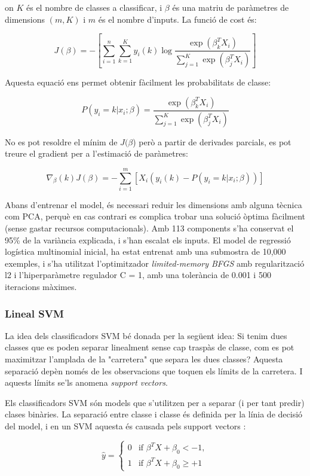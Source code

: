 \documentclass[12pt, spanish]{article}
\begin{document}
on $K$ és el nombre de classes a classificar, i $\beta$ és una matriu de paràmetres de dimensions $(m, K)$ i $m$ és el nombre d'inputs. La funció de cost és:


$$
J(\beta) = - [\sum^n_{i = 1}\sum^K_{k = 1} y_{i}(k) \log\frac{\exp(\beta_k^T X_i)}{\sum^K_{j = 1}\exp(\beta_j^T X_i)}]
$$

Aquesta equació ens permet obtenir fàcilment les probabilitats de classe:

$$
P(y_i = k | x_i ; \beta) =  \frac{\exp(\beta_k^T X_i)}{\sum^K_{j = 1}\exp(\beta_j^T X_i)}
$$

No es pot resoldre el mínim de $J(\beta$) però a partir de derivades parcials, es pot treure el gradient per a l'estimació de paràmetres:

$$
\nabla_\beta (k) J(\beta) = -\sum^m_{i = 1} [X_i (y_i(k) - P(y_i = k | x_i ; \beta))]
$$

Abans d'entrenar el model, és necessari reduir les dimensions amb alguna tècnica com PCA, perquè en cas contrari es complica trobar una solució òptima fàcilment (sense gastar recursos computacionals). Amb 113 components s'ha conservat el 95\% de la variància explicada, i s'han escalat els inputs. El model de regressió logística multinomial inicial, ha estat entrenat amb una submostra de 10,000 exemples, i s'ha utilitzat l'optimitzador \textit{limited-memory BFGS} amb regularització l2 i l'hiperparàmetre regulador C = 1, amb una tolerància de 0.001 i 500 iteracions màximes.

\subsubsection{Lineal SVM}

La idea dels classificadors SVM bé donada per la següent idea: Si tenim dues classes que es poden separar linealment sense cap traspàs de classe, com es pot maximitzar l'amplada de la "carretera" que separa les dues classes? Aquesta separació depèn només de les observacions que toquen els límits de la carretera. I aquests límits se'ls anomena \textit{support vectors}.

 Els classificadors SVM són models que s'utilitzen per a separar (i per tant predir) clases binàries. La separació entre classe i classe és definida per la línia de decisió del model, i en un SVM aquesta és causada pels support vectors \cite[Cap. 5]{geron2019hands}: 

$$
\hat{y} = \begin{cases} 
0 & \text{if } \beta^T X + \beta_0 < - 1, \\ 
1 & \text{if } \beta^T X + \beta_0 \ge + 1
\end{cases}
$$
\end{document}
